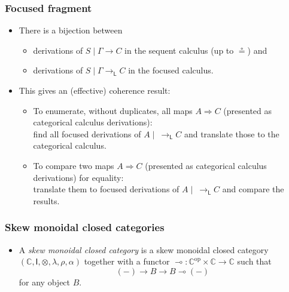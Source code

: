 \documentclass[10pt,t]{beamer}
\newcommand{\I}{\mathsf{I}}
\newcommand{\C}{\mathbb{C}}
\newcommand{\al}{\alpha}
\newcommand{\lam}{\lambda}
\newcommand{\tto}{\Longrightarrow}
\renewcommand{\vdash}{\longrightarrow}
\newcommand{\vdashL}{\vdash_\mathsf{L}}
\newcommand{\lo}{\multimap}
\newcommand{\lolli}{\lo}
\begin{document}

\begin{frame}

\frametitle{Focused fragment}

\begin{itemize}

\item There is a bijection between
\begin{itemize}
\item derivations of $S \mid \Gamma \vdash C$
  in the sequent calculus (up to $\circeq$) and 
\item derivations of $S \mid \Gamma \vdashL C$ in the focused calculus.
\end{itemize}

\bigskip

\item This gives an (effective) coherence result:

\begin{itemize}
\item To enumerate, without duplicates, all maps $A \tto C$ (presented as categorical calculus derivations): \\[9pt]

find all focused derivations of
  $A \mid ~ \vdashL C$ and translate those to the categorical calculus.

\medskip

\item To compare two maps $A \tto C$ (presented as categorical calculus
  derivations) for equality: \\[9pt] translate them to focused derivations of
  $A \mid ~ \vdashL C$ and compare the results.


\end{itemize}

\end{itemize}

\end{frame}

\begin{frame}

\frametitle{Skew monoidal closed categories}

\begin{itemize}
\item A \emph{skew monoidal closed category} is a skew monoidal closed
  category $(\C, \I, \otimes, \lam, \rho, \al)$ together with a
  functor $\lolli : \C^{\mathrm{op}} \times \C \to \C$ such that
\[
(-) \to B \vdash B \lolli (-)
\]
for any object $B$.
\end{itemize}

\end{frame}
\end{document}
